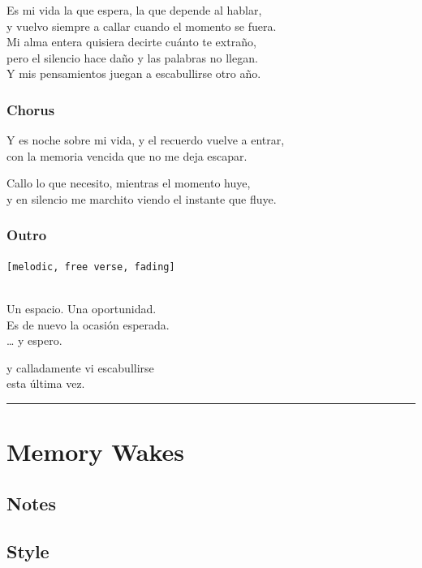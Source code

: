 \documentclass[]{article}
\begin{document}
Es mi vida la que espera, la que depende al hablar,\\
y vuelvo siempre a callar cuando el momento se fuera.\\
Mi alma entera quisiera decirte cuánto te extraño,\\
pero el silencio hace daño y las palabras no llegan.\\
Y mis pensamientos juegan a escabullirse otro año.

\subsubsection{Chorus}\label{chorus-58}

Y es noche sobre mi vida, y el recuerdo vuelve a entrar,\\
con la memoria vencida que no me deja escapar.

Callo lo que necesito, mientras el momento huye,\\
y en silencio me marchito viendo el instante que fluye.

\subsubsection{Outro}\label{outro-9}

\texttt{{[}melodic,\ free\ verse,\ fading{]}}\strut \\
Un espacio. Una oportunidad.\\
Es de nuevo la ocasión esperada.\\
\ldots{} y espero.

y calladamente vi escabullirse\\
esta última vez.

\begin{center}\rule{0.5\linewidth}{0.5pt}\end{center}

\section{Memory Wakes}\label{memory-wakes}

\subsection{Notes}\label{notes-31}

\subsection{Style}\label{style-31}
\end{document}
